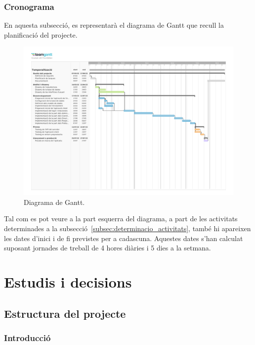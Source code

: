 \documentclass[a4paper,12pt]{ThesisStyle}
\begin{document}
\subsection{Cronograma}
\label{subsec:cronograma}

En aquesta subsecció, es representarà el diagrama de Gantt que recull la planificació del projecte.

\begin{figure}[H]
  \centering
  \includegraphics[width=1.3\textwidth, angle=90]{assets/planification_figs/ganttDiagram.pdf}
  \caption{\label{img:diagrama_gantt}Diagrama de Gantt.}
\end{figure}

Tal com es pot veure a la part esquerra del diagrama, a part de les activitats determinades a la subsecció~\ref{subsec:determinacio_activitats}, també hi apareixen les dates d'inici i de fi previstes per a cadascuna. Aquestes dates s'han calculat suposant jornades de treball de 4 hores diàries i 5 dies a la setmana.


\chapter{Estudis i decisions}
\label{cap:estudi}

\section{Estructura del projecte}
\label{sec:decisions_estructura}

\subsection{Introducció}
\label{subsec:decisions_estructura_intro}
\end{document}
